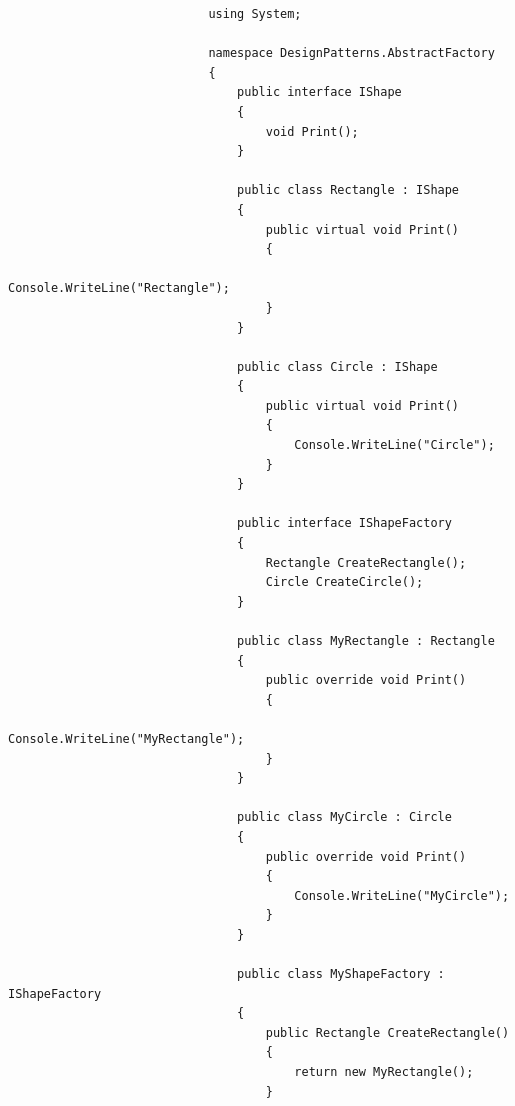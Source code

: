 \documentclass[a4paper,10pt]{article}
\begin{document}
                        \begin{lstlisting}
                            using System;

                            namespace DesignPatterns.AbstractFactory
                            {
                                public interface IShape 
                                {
                                    void Print();
                                }
                            
                                public class Rectangle : IShape
                                {
                                    public virtual void Print()
                                    {
                                        Console.WriteLine("Rectangle");
                                    }
                                }
                            
                                public class Circle : IShape
                                {
                                    public virtual void Print()
                                    {
                                        Console.WriteLine("Circle");
                                    }
                                }
                            
                                public interface IShapeFactory
                                {
                                    Rectangle CreateRectangle();
                                    Circle CreateCircle();
                                }
                            
                                public class MyRectangle : Rectangle
                                {
                                    public override void Print()
                                    {
                                        Console.WriteLine("MyRectangle");
                                    }
                                }
                            
                                public class MyCircle : Circle
                                {
                                    public override void Print()
                                    {
                                        Console.WriteLine("MyCircle");
                                    }
                                }
                            
                                public class MyShapeFactory : IShapeFactory
                                {
                                    public Rectangle CreateRectangle()
                                    {
                                        return new MyRectangle();
                                    }
                            

\end{lstlisting}
\end{document}
